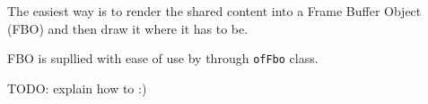 \documentclass[a4paper,titlepage,oneside]{article}
\begin{document}
The easiest way is to render the shared content into a Frame Buffer Object (FBO) and then draw it where it has to be.

FBO is supllied with ease of use by \OF{} through \lstinline[basicstyle=\footnotesize\ttfamily]{ofFbo} class.

TODO: explain how to :)

\newpage
\printbibheading
\printbibliography[nottype=online,check=notonline,heading=subbibliography,title={Bibliography}]
\printbibliography[check=online,heading=subbibliography,title={Webography}]
\nocite{openframeworks,ofxUI,REZAALI,OF_TUTORIALS_ofauckland}
\end{document}
